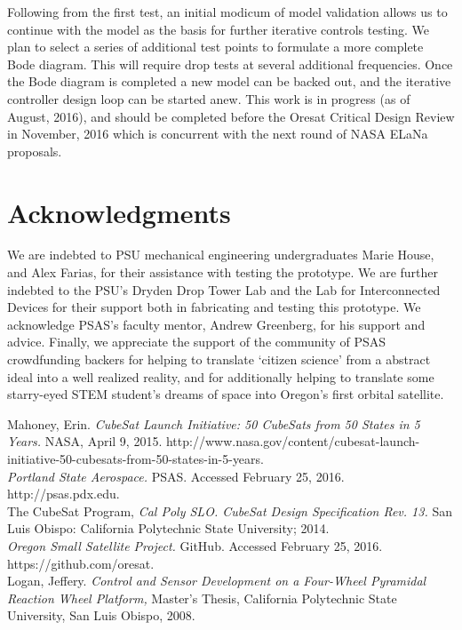 \documentclass[]{aiaa-tc}%
\begin{document}
Following from the first test, an initial modicum of model validation allows us to continue with the model as the basis for further iterative controls testing. We plan to select a series of additional test points to formulate a more complete Bode diagram. This will require drop tests at several additional frequencies. Once the Bode diagram is completed a new model can be backed out, and the iterative controller design loop can be started anew. This work is in progress (as of August, 2016), and should be completed before the Oresat Critical Design Review in November, 2016 which is concurrent with the next round of NASA ELaNa proposals.

\section{Acknowledgments}
We are indebted to PSU mechanical engineering undergraduates Marie House, and Alex Farias, for their assistance with testing the prototype. We are further indebted to the PSU's Dryden Drop Tower Lab and the Lab for Interconnected Devices for their support both in fabricating and testing this prototype. We acknowledge PSAS's faculty mentor, Andrew Greenberg, for his support and advice. Finally, we appreciate the support of the community of PSAS crowdfunding backers for helping to translate `citizen science' from a abstract ideal into a well realized reality, and for additionally helping to translate some starry-eyed STEM student's dreams of space into Oregon's first orbital satellite.

\begin{thebibliography}{9}%

Mahoney, Erin. {\it CubeSat Launch Initiative: 50 CubeSats from 50 States in 5 Years.} NASA, April 9, 2015. http://www.nasa.gov/content/cubesat-launch-initiative-50-cubesats-from-50-states-in-5-years.\\

{\it Portland State Aerospace.} PSAS. Accessed February 25, 2016. http://psas.pdx.edu.\\

The CubeSat Program, {\it Cal Poly SLO. CubeSat Design Specification Rev. 13.} San Luis
Obispo: California Polytechnic State University; 2014.\\

{\it Oregon Small Satellite Project.} GitHub. Accessed February 25, 2016. https://github.com/oresat.\\

Logan, Jeffery. {\it Control and Sensor Development on a Four-Wheel Pyramidal Reaction Wheel Platform,} Master’s Thesis, California Polytechnic State University, San Luis Obispo, 2008.\\


\end{thebibliography}
\end{document}
